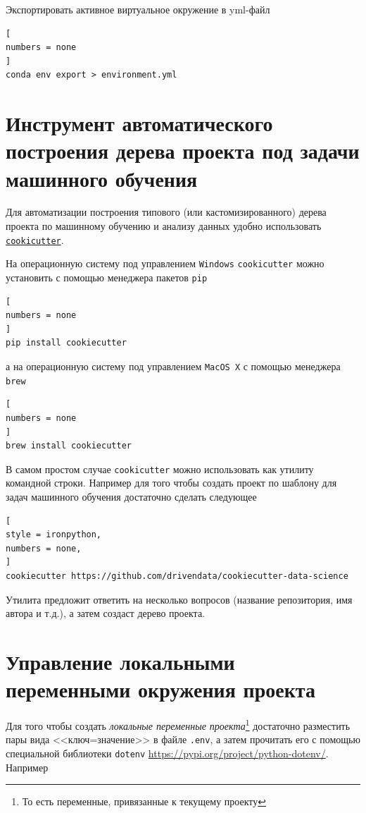 \documentclass[%
	11pt,
	a4paper,
	utf8,
		]{article}
\begin{document}
Экспортировать активное виртуальное окружение в yml-файл

\begin{lstlisting}[
numbers = none
]
conda env export > environment.yml
\end{lstlisting}


\section{Инструмент автоматического построения дерева проекта под задачи машинного обучения}

Для автоматизации построения типового (или кастомизированного) дерева проекта по машинному обучению и анализу данных удобно использовать \href{https://cookiecutter.readthedocs.io/en/1.7.2/README.html}{\texttt{cookicutter}}.

На операционную систему под управлением \texttt{Windows} \texttt{cookicutter} можно установить с помощью менеджера пакетов \texttt{pip}

\begin{lstlisting}[
numbers = none
]
pip install cookiecutter
\end{lstlisting} 
а на операционную систему под управлением \texttt{MacOS X} с помощью менеджера \texttt{brew}

\begin{lstlisting}[
numbers = none
]
brew install cookiecutter
\end{lstlisting}

В самом простом случае \texttt{cookicutter} можно использовать как утилиту командной строки. Например для того чтобы создать проект по шаблону для задач машинного обучения достаточно сделать следующее

\begin{lstlisting}[
style = ironpython,
numbers = none,
]
cookiecutter https://github.com/drivendata/cookiecutter-data-science
\end{lstlisting}

Утилита предложит ответить на несколько вопросов (название репозитория, имя автора и т.д.), а затем создаст дерево проекта.

\section{Управление локальными переменными окружения проекта}

Для того чтобы создать \emph{локальные переменные проекта}\footnote{То есть переменные, привязанные к текущему проекту} достаточно разместить пары вида <<ключ=значение>> в файле \texttt{.env}, а затем прочитать его с помощью специальной библиотеки \texttt{dotenv} \url{https://pypi.org/project/python-dotenv/}. Например
\end{document}
